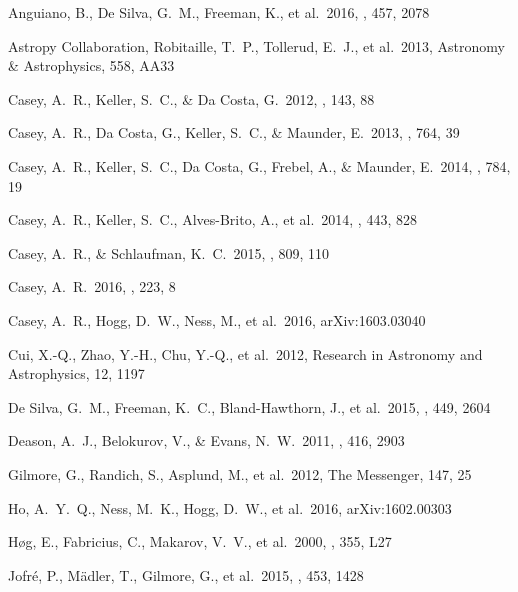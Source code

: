 \documentclass[preprint,trackchanges]{aastex}
\begin{document}
\begin{thebibliography}{dummy}

 Anguiano, B., De Silva, G.~M., Freeman, K., et al.\ 2016, \mnras, 457, 2078 

 Astropy Collaboration, Robitaille, T.~P., Tollerud, E.~J., et al.\ 2013, Astronomy \& Astrophysics, 558, AA33

 Casey, A.~R., Keller, S.~C., \& Da Costa, G.\ 2012, \aj, 143, 88 

 Casey, A.~R., Da Costa, G., Keller, S.~C., \& Maunder, E.\ 2013, \apj, 764, 39 

 Casey, A.~R., Keller, S.~C., Da Costa, G., Frebel, A., \& Maunder, E.\ 2014, \apj, 784, 19 

 Casey, A.~R., Keller, S.~C., Alves-Brito, A., et al.\ 2014, \mnras, 443, 828 

 Casey, A.~R., \& Schlaufman, K.~C.\ 2015, \apj, 809, 110 

 Casey, A.~R.\ 2016, \apjs, 223, 8 

 Casey, A.~R., Hogg, D.~W., Ness, M., et al.\ 2016, arXiv:1603.03040 

 Cui, X.-Q., Zhao, Y.-H., Chu, Y.-Q., et al.\ 2012, Research in Astronomy and Astrophysics, 12, 1197 

 De Silva, G.~M., Freeman, K.~C., Bland-Hawthorn, J., et al.\ 2015, \mnras, 449, 2604 

 Deason, A.~J., Belokurov, V., \& Evans, N.~W.\ 2011, \mnras, 416, 2903 

 Gilmore, G., Randich, S., Asplund, M., et al.\ 2012, The Messenger, 147, 25

 Ho, A.~Y.~Q., Ness, M.~K., Hogg, D.~W., et al.\ 2016, arXiv:1602.00303 
 
 H{\o}g, E., Fabricius, C., Makarov, V.~V., et al.\ 2000, \aap, 355, L27 

 Jofr{\'e}, P., M{\"a}dler, T., Gilmore, G., et al.\ 2015, \mnras, 453, 1428 


\end{thebibliography}
\end{document}
